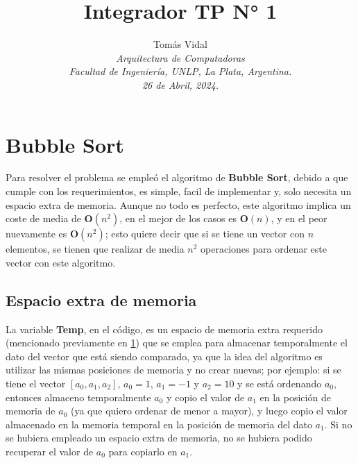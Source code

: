 \documentclass[letterpaper, 10 pt, conference]{ieeeconf}  %
\title{\LARGE \bf Integrador TP N° 1}
\author{
  Tom\'as Vidal\\
  {\it Arquitectura de Computadoras}\\
  {\it Facultad de Ingenier\'ia, UNLP, La Plata, Argentina.}\\
  {\it 26 de Abril, 2024.}
}                                            %
\begin{document}
\maketitle
\thispagestyle{empty}
\pagestyle{empty}


\section{Bubble Sort} \label{sec:bubble_sort}
Para resolver el problema se empleó el algoritmo de \textbf{Bubble Sort}, debido a que cumple con los requerimientos, es simple, facil de implementar y, solo necesita un espacio extra de memoria. Aunque no todo es perfecto, este algoritmo implica un coste de media de $\textbf{O}(n^{2})$, en el mejor de los casos es $\textbf{O}(n)$, y en el peor nuevamente es $\textbf{O}(n^{2})$; esto quiere decir que si se tiene un vector con $n$ elementos, se tienen que realizar de media $n^{2}$ operaciones para ordenar este vector con este algoritmo.

\subsection{Espacio extra de memoria}
La variable \textbf{Temp}, en el código, es un espacio de memoria extra requerido (mencionado previamente en \ref{sec:bubble_sort}) que se emplea para almacenar temporalmente el dato del vector que está siendo comparado, ya que la idea del algoritmo es utilizar las mismas posiciones de memoria y no crear nuevas; por ejemplo: si se tiene el vector $[a_0, a_1, a_2]$, $a_0=1$, $a_1=-1$ y $a_2=10$ y se está ordenando $a_0$, entonces almaceno temporalmente $a_0$ y copio el valor de $a_1$ en la posición de memoria de $a_0$ (ya que quiero ordenar de menor a mayor), y luego copio el valor almacenado en la memoria temporal en la posición de memoria del dato $a_1$. Si no se hubiera empleado un espacio extra de memoria, no se hubiera podido recuperar el valor de $a_0$ para copiarlo en $a_1$.
\end{document}
